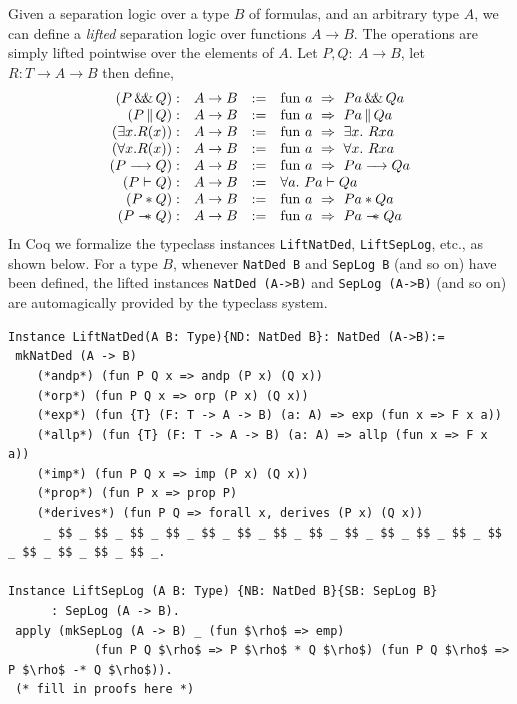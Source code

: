 \documentclass[12pt,fleqn,openany,oneside,showtrims]{memoir}
\begin{document}
Given a separation logic over a type $B$ of formulas,
and an arbitrary type $A$,
we can define a \emph{lifted} separation logic over functions $A \rightarrow B$.
The operations are simply lifted pointwise over the
elements of $A$.  Let $P,Q:~A\rightarrow B$,
let $R:T\rightarrow A \rightarrow B$ then define,
\[
\begin{array}{rccl}
(P \andp Q):& A\rightarrow B&:=& \mathrm{fun}~a~\Rightarrow~Pa \andp Qa\\
(P \orp Q):& A\rightarrow B&:=& \mathrm{fun}~a~\Rightarrow~Pa \orp Qa\\
(\exists x.R(x)):& A\rightarrow B&:=& \mathrm{fun}~a~\Rightarrow~\exists x.~Rxa\\
(\forall x.R(x)):& A\rightarrow B&:=& \mathrm{fun}~a~\Rightarrow~\forall x.~Rxa\\
(P \imp Q):& A\rightarrow B&:=& \mathrm{fun}~a~\Rightarrow~Pa \imp Qa\\
(P \vdash Q):& A\rightarrow B&:=& \forall a.~Pa \vdash Qa\\
(P * Q):& A\rightarrow B&:=& \mathrm{fun}~a~\Rightarrow~Pa * Qa\\
(P \wand Q):& A\rightarrow B&:=& \mathrm{fun}~a~\Rightarrow~Pa \wand Qa\\
\end{array}
\]
In Coq we formalize the typeclass instances
\lstinline{LiftNatDed},
\lstinline{LiftSepLog}, etc.,
as shown below.
For a type $B$, whenever \lstinline{NatDed B} and \lstinline{SepLog B} (and so on) have been defined, the lifted instances
\lstinline{NatDed (A->B)} and \lstinline{SepLog (A->B)} (and so on)
are automagically provided by the typeclass system.

\begin{lstlisting}
Instance LiftNatDed(A B: Type){ND: NatDed B}: NatDed (A->B):=
 mkNatDed (A -> B)
    (*andp*) (fun P Q x => andp (P x) (Q x))
    (*orp*) (fun P Q x => orp (P x) (Q x))
    (*exp*) (fun {T} (F: T -> A -> B) (a: A) => exp (fun x => F x a))
    (*allp*) (fun {T} (F: T -> A -> B) (a: A) => allp (fun x => F x a))
    (*imp*) (fun P Q x => imp (P x) (Q x))
    (*prop*) (fun P x => prop P)
    (*derives*) (fun P Q => forall x, derives (P x) (Q x))
     _ $$ _ $$ _ $$ _ $$ _ $$ _ $$ _ $$ _ $$ _ $$ _ $$ _ $$ _ $$ _ $$ _ $$ _ $$ _ $$ _ $$ _.

Instance LiftSepLog (A B: Type) {NB: NatDed B}{SB: SepLog B}
      : SepLog (A -> B).
 apply (mkSepLog (A -> B) _ (fun $\rho$ => emp)
            (fun P Q $\rho$ => P $\rho$ * Q $\rho$) (fun P Q $\rho$ => P $\rho$ -* Q $\rho$)).
 (* fill in proofs here *)
\end{lstlisting}
\end{document}
